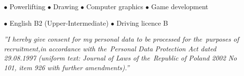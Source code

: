 \documentclass[11pt,a4paper]{article}
\begin{document}
  
    \vspace{0.3cm}
  
    \medskip
    \centerline{
        \hfill
        $\bullet$ Powerlifting
        \hfill
        $\bullet$ Drawing
        \hfill
        $\bullet$ Computer graphics
        \hfill
        $\bullet$ Game development
        \hfill
    }
  
  
    \vspace{0.5cm}
  
    \medskip
    \centerline{
        \hfill
        $\bullet$ English B2 (Upper-Intermediate)
        \hfill
        $\bullet$ Driving licence B
        \hfill
    }
  
  
    \vspace{0.92cm}
    \noindent \textit{''I hereby give consent for my personal data to be processed for the~purposes
    of recruitment,\linebreak in accordance with the~Personal Data Protection Act dated 29.08.1997
    (uniform text: Journal of Laws of the~Republic of Poland 2002 No 101, item 926
    with further amendments).''}
\end{document}
